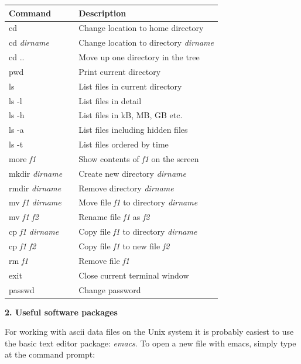 \documentclass[12pt]{article}
\begin{document}
\begin{table}[h]
\centering
\begin{tabular}{lll}
\hline
Command&&Description\\
\hline
cd                        && Change location to home directory\\
cd {\it dirname}          && Change location to directory {\it dirname}\\
cd ..                     && Move up one directory in the tree\\
pwd                       && Print current directory\\
ls                        && List files in current directory\\
ls -l                     && List files in detail\\
ls -h                     && List files in kB, MB, GB etc.\\
ls -a                     && List files including hidden files\\
ls -t                     && List files ordered by time\\
more {\it f1}             && Show contents of {\it f1} on the screen\\
mkdir {\it dirname}       && Create new directory {\it dirname}\\
rmdir {\it dirname}       && Remove directory {\it dirname}\\
mv {\it f1} {\it dirname} && Move file {\it f1} to directory {\it dirname}\\
mv {\it f1} {\it f2}      && Rename file {\it f1} as {\it f2}\\
cp {\it f1} {\it dirname} && Copy file {\it f1} to directory {\it dirname}\\
cp {\it f1} {\it f2}      && Copy file {\it f1} to new file {\it f2}\\
rm {\it f1}               && Remove file {\it f1}\\
exit                      && Close current terminal window\\
passwd                    && Change password\\
\hline
\end{tabular}
\end{table}

\begin{center}
{\large{\bf 2. Useful software packages}}
\end{center}

For working with ascii data files on the Unix system it is probably
easiest to use the basic text editor package: {\it emacs}. To open a new
file with emacs, simply type at the command prompt:
\end{document}
